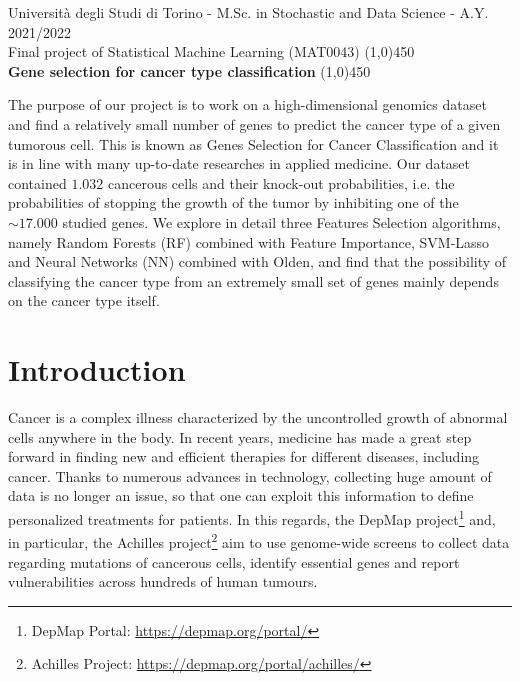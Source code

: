 \documentclass[a4paper,11pt, oneside]{article}  %
\begin{document}
\setcounter{secnumdepth}{2}
\pagestyle{plain} %

\begin{center}
	Università degli Studi di Torino - M.Sc.  in Stochastic and Data Science - A.Y.  2021/2022 \\
	\Large { Final project of Statistical Machine Learning (MAT0043)}
	\line(1,0){450}\\ 
	\vspace{0.4cm} 
	{ \huge \textbf{Gene selection for cancer type classification} }
	\vspace{0.1cm}
	\line(1,0){450} \\
\end{center}


The purpose of our project is to work on a high-dimensional genomics dataset and find a relatively small number of genes to predict the cancer type of a given tumorous cell. This is known as Genes Selection for Cancer Classification and it is in line with many up-to-date researches in applied medicine.  Our dataset contained $1.032$ cancerous cells and their knock-out probabilities, i.e.  the probabilities of stopping the growth of the tumor by inhibiting one of the $\sim 17.000$ studied genes.  We explore in detail three Features Selection algorithms,  namely Random Forests (RF) combined with Feature Importance, SVM-Lasso and Neural Networks (NN) combined with Olden,  and find that the possibility of classifying the cancer type from an extremely small set of genes mainly depends on the cancer type itself.  


\section{Introduction}
Cancer is a complex illness characterized by the uncontrolled growth of abnormal cells anywhere in the body.  In recent years,  medicine has made a great step forward in finding new and efficient therapies for different diseases,  including cancer.  Thanks to numerous advances in technology,  collecting huge amount of data is no longer an issue,  so that one can exploit this information to define personalized treatments for patients.  In this regards,  the DepMap project\footnote{DepMap Portal: \url{https://depmap.org/portal/} } and,  in particular,  the Achilles project\footnote{Achilles Project: \url{https://depmap.org/portal/achilles/} } aim to use genome-wide screens to collect data regarding mutations of cancerous cells,  identify essential genes and report vulnerabilities across hundreds of human tumours. 
\end{document}
